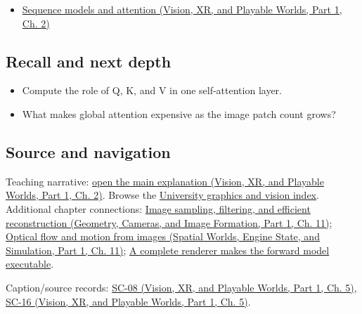 \begin{itemize}
\tightlist
\item
  \href{../07-Vision-XR-and-Playable-Worlds-P01/main.pdf\#04-visual-computing-ii-ch031-sequence-models-and-attention}{Sequence models and attention (Vision, XR, and Playable Worlds, Part 1, Ch. 2)}
\end{itemize}

\subsection{Recall and next depth}\label{appendix-a9d5dfdd164a-recall-and-next-depth}

\hypertarget{appendix-a9d5dfdd164a-recall-and-next-depth}{}

\begin{itemize}
\tightlist
\item
  Compute the role of Q, K, and V in one self-attention layer.
\item
  What makes global attention expensive as the image patch count grows?
\end{itemize}

\subsection{Source and navigation}\label{appendix-a9d5dfdd164a-source-and-navigation}

\hypertarget{appendix-a9d5dfdd164a-source-and-navigation}{}

Teaching narrative: \href{../07-Vision-XR-and-Playable-Worlds-P01/main.pdf\#04-visual-computing-ii-ch031-sequence-models-and-attention}{open the main explanation (Vision, XR, and Playable Worlds, Part 1, Ch. 2)}. Browse the \hyperref[appendix-a6d556a4ef50-university-graphics-vision-and-photography---independent-series]{University graphics and vision index}. Additional chapter connections: \href{../03-Geometry-Cameras-and-Image-Formation-P01/main.pdf\#03-visual-computing-i-ch004-image-sampling-filtering-and-efficient-reconstruction}{Image sampling, filtering, and efficient reconstruction (Geometry, Cameras, and Image Formation, Part 1, Ch. 11)}; \href{../05-Spatial-Worlds-Engine-State-and-Simulation-P01/main.pdf\#04-visual-computing-ii-ch030-optical-flow-and-motion-from-images}{Optical flow and motion from images (Spatial Worlds, Engine State, and Simulation, Part 1, Ch. 11)}; \hyperref[04-visual-computing-ii-ch035-a-complete-renderer-makes-the-forward-model-executable]{A complete renderer makes the forward model executable}.

Caption/source records: \href{../07-Vision-XR-and-Playable-Worlds-P01/main.pdf\#04-visual-computing-ii-ch036-sc-08---stanford-cs231n-spring-2025-lecture-8-attention-and-transformers}{SC-08 (Vision, XR, and Playable Worlds, Part 1, Ch. 5)}, \href{../07-Vision-XR-and-Playable-Worlds-P01/main.pdf\#04-visual-computing-ii-ch036-sc-16---stanford-cs231n-deep-learning-for-computer-vision-spring-2025-lecture-16-vision-and-language}{SC-16 (Vision, XR, and Playable Worlds, Part 1, Ch. 5)}.
